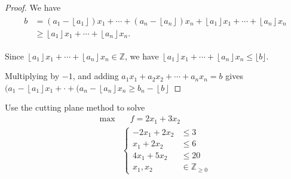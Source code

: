 \begin{proof}
    We have
\begin{align*}
\begin{aligned}
b & =\left(a_1-\left\lfloor a_1\right\rfloor\right) x_1+\cdots+\left(a_n-\left\lfloor a_n\right\rfloor\right) x_n+\left\lfloor a_1\right\rfloor x_1+\cdots+\left\lfloor a_n\right\rfloor x_n \\
& \geqslant\left\lfloor a_1\right\rfloor x_1+\cdots+\left\lfloor a_n\right\rfloor x_n .
\end{aligned}
\end{align*}

Since $\left\lfloor a_1\right\rfloor x_1+\cdots+\left\lfloor a_n\right\rfloor x_n \in \mathbb{Z}$, we have $\left\lfloor a_1\right\rfloor x_1+\cdots+\left\lfloor a_n\right\rfloor x_n \leqslant\lfloor b\rfloor$.

Multiplying by $-1$, and adding $a_1x_1+a_2x_2+\cdots+a_nx_n =b$ gives $(a_1-\left\lfloor a_1\right\rfloor x_1 +\cdot + (a_n-\left\lfloor a_n\right\rfloor x_n \geqslant b_n-\left\lfloor b\right\rfloor$
\end{proof}

\begin{example}
    Use the cutting plane method to solve
    \begin{align}
        \max &\quad f=2x_1+3x_2 \label{1.33}
        \\
        & \left\lbrace\begin{array}{ll}
            -2x_1+2x_2&\leqslant 3  \\
            x_1+2x_2 &\leqslant 6\\
            4x_1 +5x_2&\leqslant 20\\
            x_1, x_2&\in\mathbb{Z}_{\geqslant 0}
        \end{array} \right.\nonumber
    \end{align}
\end{example}

